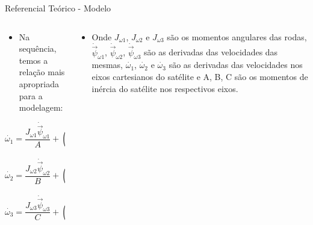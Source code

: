 \documentclass{beamer}
\begin{document}

\begin{frame}{Referencial Teórico - Modelo}

 \begin{columns}
    \begin{column}{0.50\textwidth}
	\begin{itemize}
		\justifying
		\item Na sequência, temos a relação mais apropriada para a modelagem:
    \end{itemize}
    	\begin{equation}\label{eq:modeloA}
	  \dot{\omega_{1}}=\frac{J_{\omega 1}\dot{\vec{\psi}}_{\omega 1}}{A}+\left(\frac{B-C}{A}\right)\omega_{2}\omega_{3}
	\end{equation}

	\begin{equation}\label{eq:modeloB}
	  \dot{\omega_{2}}=\frac{J_{\omega 2}\dot{\vec{\psi}}_{\omega 2}}{B}+\left(\frac{C-A}{B}\right)\omega_{1}\omega_{3}
	\end{equation}

	\begin{equation}\label{eq:modeloC}
	  \dot{\omega_{3}}=\frac{J_{\omega 3}\dot{\vec{\psi}}_{\omega 3}}{C}+\left(\frac{A-B}{C}\right)\omega_{1}\omega_{2}
	\end{equation}
    \end{column}
    \begin{column}{0.5\textwidth}

	\begin{itemize}
		\justifying
		\item Onde  $J_{\omega 1}$, $J_{\omega 2}$ e $J_{\omega 3}$ são os momentos angulares das rodas, $\dot{\vec{\psi}}_{\omega 1}$, $\dot{\vec{\psi}}_{\omega 2}$, $\dot{\vec{\psi}}_{\omega 3}$ são as derivadas das velocidades das mesmas, $\dot{\omega_1}$, $\dot{\omega_2}$ e $\dot{\omega_3}$ são as derivadas das velocidades nos eixos cartesianos do satélite e A, B, C são os momentos de inércia do satélite nos respectivos eixos.
    \end{itemize}
	\end{column}
\end{columns}

\end{frame}

\end{document}
